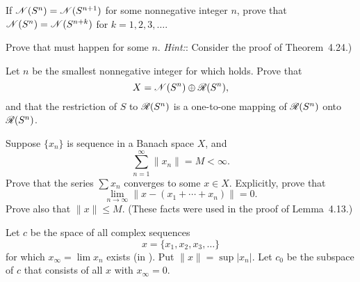 \begin{enumerate}
\begin{excopy}
\begin{itemize}
If \(\mathscr{N}(S^n) = \mathscr{N}(S^{n+1})\) for some  nonnegative integer $n$,
 prove that \(\mathscr{N}(S^n) = \mathscr{N}(S^{n+k})\)
for \(k=1,2,3,\ldots\).

Prove that  must happen for some $n$. 
\emph{Hint:}: Consider the proof of Theorem~4.24.)

Let $n$ be the smallest nonnegative integer for which  holds.
 Prove that
\begin{equation*}
X = \mathscr{N}(S^n) \oplus \mathscr{R}(S^n),
\end{equation*}
and that the restriction of $S$ to \(\mathscr{R}(S^n)\) is a one-to-one mapping
 of \(\mathscr{R}(S^n)\) onto \(\mathscr{R}(S^n)\).

\end{itemize}

\end{excopy}

\begin{itemize}




\end{itemize}



\unfinished

\begin{excopy}
Suppose \(\{x_n\}\) is sequence in a Banach space $X$, and
\begin{equation*}
 \sum_{n=1}^\infty \|x_n\| = M < \infty.
\end{equation*}
Prove that the series \(\sum x_n\) converges to some \(x \in X\).
 Explicitly, prove that
\begin{equation*}
\lim_{n\to\infty} \|x - (x_1 + \cdots + x_n)\| = 0.
\end{equation*}
Prove also that \(\|x\| \leq M\).
 (These facts were used in the proof of Lemma~4.13.)
\end{excopy}


\unfinished

\begin{excopy}
Let $c$ be the space of all complex sequences
\begin{equation*}
x = \{x_1,x_2,x_3,\ldots\}
\end{equation*}
for which \(x_\infty = \lim x_n\) exists (in \C).
 Put \(\|x\| = \sup |x_n|\). Let \(c_0\) be the subspace of $c$ that
consists of all $x$ with \(x_\infty = 0\).
\begin{itemize}


\end{itemize}
\end{excopy}
\end{enumerate}
